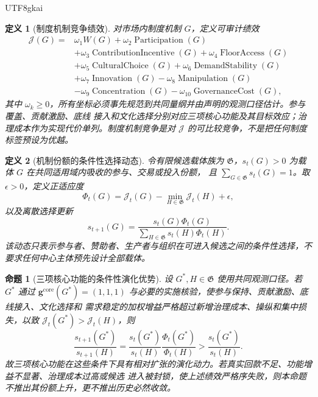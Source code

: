 \documentclass[12pt,a4paper,openany]{report}
\newtheorem{definition}{定义}[chapter]
\newtheorem{proposition}{命题}[chapter]
\begin{document}
\begin{CJK*}{UTF8}{gkai}
\begin{definition}[制度机制竞争绩效]
对市场内制度机制 \(G\)，定义可审计绩效
\[
\begin{aligned}
  \mathcal J(G)
  ={}&
  \omega_1 W(G)
  +\omega_2\operatorname{Participation}(G)\\
  &+\omega_3\operatorname{ContributionIncentive}(G)
  +\omega_4\operatorname{FloorAccess}(G)\\
  &+\omega_5\operatorname{CulturalChoice}(G)
  +\omega_6\operatorname{DemandStability}(G)\\
  &+\omega_7\operatorname{Innovation}(G)
  -\omega_8\operatorname{Manipulation}(G)\\
  &-\omega_9\operatorname{Concentration}(G)
  -\omega_{10}\operatorname{GovernanceCost}(G),
\end{aligned}
\]
其中 \(\omega_k\ge0\)，所有坐标必须事先规范到共同量纲并由声明的观测口径估计。参与覆盖、贡献激励、底线
接入和文化选择分别对应三项核心功能及其目标效应；治理成本作为实现代价单列。制度机制竞争是对
\(\mathcal J\) 的可比较竞争，不是把任何制度标签预设为优越。
\end{definition}

\begin{definition}[机制份额的条件性选择动态]
令有限候选载体族为 \(\mathfrak G\)，\(s_t(G)>0\) 为载体 \(G\) 在共同适用域内吸收的参与、交易或投入份额，
且 \(\sum_{G\in\mathfrak G}s_t(G)=1\)。取 \(\epsilon>0\)，定义正适应度
\[
  \Phi_t(G)
  =\mathcal J_t(G)-\min_{H\in\mathfrak G}\mathcal J_t(H)+\epsilon,
\]
以及离散选择更新
\[
  s_{t+1}(G)
  =\frac{s_t(G)\Phi_t(G)}
  {\sum_{H\in\mathfrak G}s_t(H)\Phi_t(H)}.
\]
该动态只表示参与者、赞助者、生产者与组织在可进入候选之间的条件性选择，不要求任何中心主体预先设计全部载体。
\end{definition}

\begin{proposition}[三项核心功能的条件性演化优势]
\label{prop:core-functions-evolutionary-advantage}
设 \(G^*,H\in\mathfrak G\) 使用共同观测口径。若 \(G^*\) 通过
\(\mathbf g^{\mathrm{core}}(G^*)=(1,1,1)\) 与必要的实施核验，使参与保持、贡献激励、底线接入、文化选择和
需求稳定的加权增益严格超过新增治理成本、操纵和集中损失，以致
\(\mathcal J_t(G^*)>\mathcal J_t(H)\)，则
\[
  \frac{s_{t+1}(G^*)}{s_{t+1}(H)}
  =\frac{s_t(G^*)}{s_t(H)}
  \frac{\Phi_t(G^*)}{\Phi_t(H)}
  >\frac{s_t(G^*)}{s_t(H)}.
\]
故三项核心功能在这些条件下具有相对扩张的演化动力。若真实回款不足、功能增益不显著、治理成本过高或候选
进入被封锁，使上述绩效严格序失败，则本命题不推出其份额上升，更不推出历史必然收敛。
\end{proposition}


\end{CJK*}
\end{document}
